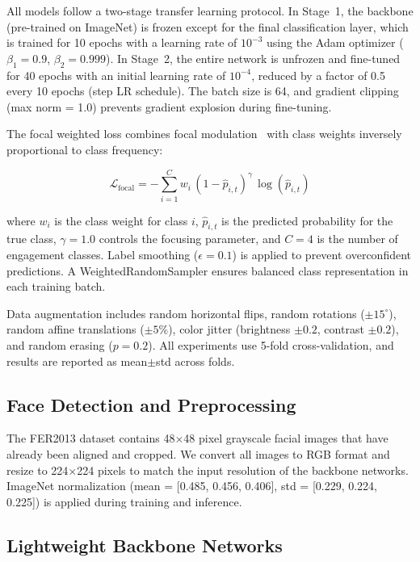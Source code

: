 \documentclass[sensors,article,submit,pdftex,moreauthors]{Definitions/mdpi}
\begin{document}
All models follow a two-stage transfer learning protocol. In Stage~1, the backbone (pre-trained on ImageNet) is frozen except for the final classification layer, which is trained for 10 epochs with a learning rate of $10^{-3}$ using the Adam optimizer ($\beta_1 = 0.9$, $\beta_2 = 0.999$). In Stage~2, the entire network is unfrozen and fine-tuned for 40 epochs with an initial learning rate of $10^{-4}$, reduced by a factor of 0.5 every 10 epochs (step LR schedule). The batch size is 64, and gradient clipping (max norm = 1.0) prevents gradient explosion during fine-tuning.

The focal weighted loss combines focal modulation~\cite{lin2017focal} with class weights inversely proportional to class frequency:

\begin{equation}
\mathcal{L}_{\text{focal}} = -\sum_{i=1}^{C} w_i \, (1 - \hat{p}_{i,t})^{\gamma} \, \log(\hat{p}_{i,t})
\end{equation}

where $w_i$ is the class weight for class $i$, $\hat{p}_{i,t}$ is the predicted probability for the true class, $\gamma = 1.0$ controls the focusing parameter, and $C = 4$ is the number of engagement classes. Label smoothing ($\epsilon = 0.1$) is applied to prevent overconfident predictions. A WeightedRandomSampler ensures balanced class representation in each training batch.

Data augmentation includes random horizontal flips, random rotations ($\pm15^{\circ}$), random affine translations ($\pm5\%$), color jitter (brightness $\pm0.2$, contrast $\pm0.2$), and random erasing ($p = 0.2$). All experiments use 5-fold cross-validation, and results are reported as mean$\pm$std across folds.

\subsection{Face Detection and Preprocessing}

The FER2013 dataset contains 48$\times$48 pixel grayscale facial images that have already been aligned and cropped. We convert all images to RGB format and resize to 224$\times$224 pixels to match the input resolution of the backbone networks. ImageNet normalization (mean = [0.485, 0.456, 0.406], std = [0.229, 0.224, 0.225]) is applied during training and inference.

\subsection{Lightweight Backbone Networks}
\end{document}
